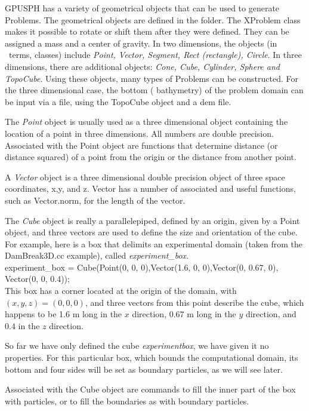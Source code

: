 GPUSPH has a variety of geometrical objects that can be used to generate Problems.
The geometrical objects are defined in the  folder.
The XProblem class makes it possible to rotate or shift them after they were defined.
They can be assigned a mass and a center of gravity.
In two dimensions, the objects (in \cpp\ terms, classes) include {\em
Point, Vector, Segment, Rect (rectangle), Circle}. In three
dimensions, there are additional objects: {\em Cone, Cube, Cylinder,
Sphere and TopoCube}. Using these objects, many types of Problems can
be constructed. For the three dimensional case, the bottom (
bathymetry) of the problem domain can be input via a file, using the
TopoCube object and a dem file.

The {\em Point} object is usually used as a three dimensional object
containing the location of a point in three dimensions. All numbers are
double precision. Associated with the Point object are functions that
determine distance (or distance squared) of a point from the origin or
the distance from another point.

A {\em Vector} object is a three dimensional double precision object of
three space coordinates, x,y, and z. Vector has a number of associated
and useful functions, such as Vector.norm, for the length of the vector.


The {\em Cube} object is really a parallelepiped, defined by an origin,
given by a Point object, and three vectors are used to define the size
and orientation of the cube. For example, here is a box that delimits
an experimental domain (taken from the DamBreak3D.cc example), called
{\em experiment\_box.} \\

\noindent experiment\_box = Cube(Point(0, 0, 0),Vector(1.6, 0,
0),Vector(0, 0.67, 0), Vector(0, 0, 0.4));\\

This box has a corner located at the origin of the domain, with $(x, y,
z) = (0,0,0)$, and three vectors from this point describe the cube,
which happens to be 1.6 m long in the $x$ direction, 0.67 m long in the
$y$ direction, and $0.4$ in the $z$ direction.

So far we have only defined the cube {\em experiment\-box}, we have
given it no properties. For this particular box, which bounds the
computational domain, its bottom and four sides will be set as boundary
particles, as we will see later.

Associated with the Cube object are commands to fill the inner part of
the box with particles, or to fill the boundaries as with boundary
particles. %


